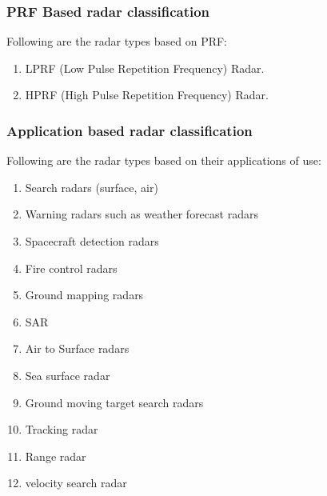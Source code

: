 \documentclass[14pt]{article} %
\begin{document}
\subsubsection{PRF Based radar classification}
\noindent Following are the radar types based on PRF:
\begin{enumerate}
\item	LPRF (Low Pulse Repetition Frequency) Radar.
\item	HPRF (High Pulse Repetition Frequency) Radar.
\end{enumerate}

\subsubsection{Application based radar classification}
 \noindent Following are the radar types based on their applications of use: 
\begin{enumerate}
\item	Search radars (surface, air)
\item	Warning radars such as weather forecast radars 
\item	Spacecraft detection radars
\item	Fire control radars
\item	Ground mapping radars
\item	SAR 
\item	Air to Surface radars 
\item	Sea surface radar 
\item	Ground moving target search radars 
\item	 Tracking radar
\item	 Range radar
\item	 velocity search radar
\end{enumerate}
\end{document}
